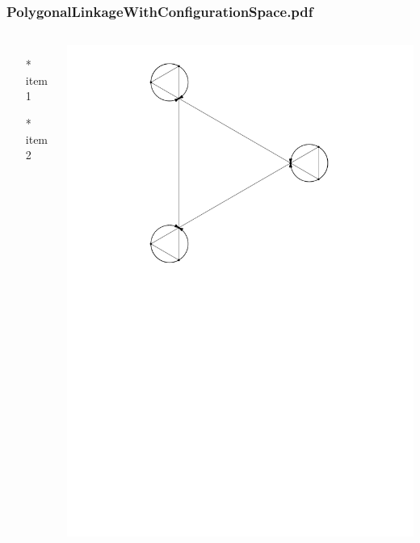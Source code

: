 \begin{frame} \frametitle{PolygonalLinkageWithConfigurationSpace.pdf}
    \begin{columns}[c]
        \begin{itemize}
            \item[*] item 1
            \item[*] item 2
        \end{itemize}
        \begin{minipage}{\linewidth}
            \begin{center}
            \includegraphics[width=.9\textwidth]{graphics/PolygonalLinkageWithConfigurationSpace.pdf}
            \label{gfx:PolygonalLinkageWithConfigurationSpace.pdf}
            \end{center}
        \end{minipage}
    \end{columns}
\end{frame}
